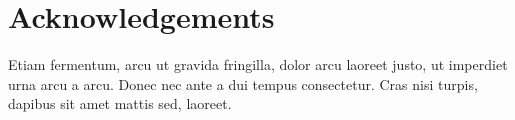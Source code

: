 \documentclass[a0,portrait]{a0poster}
\begin{document}

\color{DarkSlateGray} %


\nocite{*} %


\section*{Acknowledgements}

Etiam fermentum, arcu ut gravida fringilla, dolor arcu laoreet justo, ut imperdiet urna arcu a arcu. Donec nec ante a dui tempus consectetur. Cras nisi turpis, dapibus sit amet mattis sed, laoreet.


\end{document}
